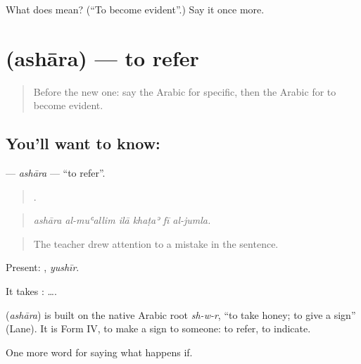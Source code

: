 \begin{tcolorbox}[breakable,colback=teal!4,colframe=teal!35!black,title={Before you move on}]
What does  mean? (\textquotedblleft{}To become evident\textquotedblright{}.) Say it once more.
\end{tcolorbox}
\section[\texorpdfstring{\ar{أشار} (ashāra)}{أشار (ashāra)}]{ (ashāra) — to refer}

\label{lesson:AR-C417-ashara}



\begin{quote}
Before the new one: say the Arabic for specific, then the Arabic for to become evident.
\end{quote}

\subsection*{You'll want to know: }
\textbf{} — \emph{ashāra} — \textquotedblleft{}to refer\textquotedblright{}.

\begin{quote}
     .
\end{quote}

\begin{quote}
\emph{ashāra al-muʿallim ilā khaṭaʾ fī al-jumla.}
\end{quote}

\begin{quote}
The teacher drew attention to a mistake in the sentence.
\end{quote}

Present: , \emph{yushīr}.

It takes :   ….

\begin{cousinweb}
\textbf{} (\emph{ashāra}) is built on the native Arabic root \emph{sh-w-r}, \textquotedblleft{}to take honey; to give a sign\textquotedblright{} (Lane). It is Form IV, to make a sign to someone: to refer, to indicate.
\end{cousinweb}

\begin{grammarlens}[title={What you've built}]
One more word for saying what happens if.
\end{grammarlens}

